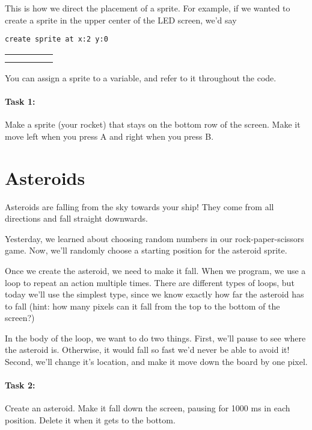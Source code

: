 \documentclass{article}
\begin{document}
\begin{multicols*}{2}
This is how we direct the placement of a sprite. For example, if we wanted to create a sprite in the upper center of the LED screen, we'd say
\begin{center}
\texttt{create sprite at x:2 y:0}

\vspace{4mm}

\begin{tabular}{*{5}{|c}|}
\hline
& &  & & \\ \hline
 & & & & \\ \hline
 & & & & \\ \hline
\end{tabular}
\end{center}

You can assign a sprite to a variable, and refer to it throughout the code.

\paragraph{Task 1:} Make a sprite (your rocket) that stays on the bottom row of the screen. Make it move left when you press A and right when you press B.

\section{Asteroids}
Asteroids are falling from the sky towards your ship! They come from all directions and fall straight downwards.

Yesterday, we learned about choosing random numbers in our rock-paper-scissors game. Now, we'll randomly choose a starting position for the asteroid sprite. 

Once we create the asteroid, we need to make it fall. When we program, we use a loop to repeat an action multiple times. There are different types of loops, but today we'll use the simplest type, since we know exactly how far the asteroid has to fall (hint: how many pixels can it fall from the top to the bottom of the screen?)

In the body of the loop, we want to do two things. First, we'll pause to see where the asteroid is. Otherwise, it would fall so fast we'd never be able to avoid it! Second, we'll change it's location, and make it move down the board by one pixel. 

\paragraph{Task 2:} Create an asteroid. Make it fall down the screen, pausing for 1000 ms in each position. Delete it when it gets to the bottom.


\end{multicols*}
\end{document}
